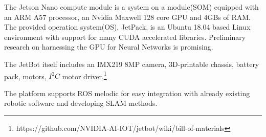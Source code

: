 \documentclass[class=report, crop=false]{standalone}
\begin{document}
The Jetson Nano compute module is a system on a module(SOM) equipped with an ARM A57 processor, an Nvidia Maxwell 128 core GPU and 4GBs of RAM. The provided operation system(OS), JetPack, is an Ubuntu 18.04 based Linux environment with support for many CUDA accelerated libraries. Preliminary research\cite{hubbard2019} on harnessing the GPU for Neural Networks is promising.

The JetBot itself includes an IMX219 8MP camera, 3D-printable chassis, battery pack, motors, $ I^2C $ motor driver.\footnote{https://github.com/NVIDIA-AI-IOT/jetbot/wiki/bill-of-materials}

The platform supports ROS melodic for easy integration with already existing robotic software and developing SLAM methods.

\end{document}
